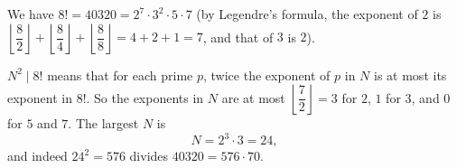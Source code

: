 We have \(8!=40320=2^7\cdot3^2\cdot5\cdot7\) (by Legendre's formula, the exponent of \(2\) is \(\left\lfloor\dfrac{8}{2}\right\rfloor+\left\lfloor\dfrac{8}{4}\right\rfloor+\left\lfloor\dfrac{8}{8}\right\rfloor=4+2+1=7\), and that of \(3\) is \(2\)).

\(N^2\mid 8!\) means that for each prime \(p\), twice the exponent of \(p\) in \(N\) is at most its exponent in \(8!\). So the exponents in \(N\) are at most \(\left\lfloor\dfrac{7}{2}\right\rfloor=3\) for \(2\), \(1\) for \(3\), and \(0\) for \(5\) and \(7\). The largest \(N\) is
\[
N=2^3\cdot3=\boxed{24},
\]
and indeed \(24^2=576\) divides \(40320=576\cdot70\).
